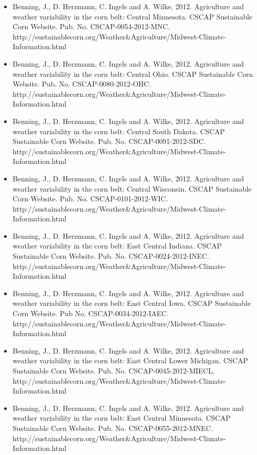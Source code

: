 \begin{itemize}
\item Benning, J., D. Herzmann, C. Ingels and A. Wilke, 2012. Agriculture and weather variability in the corn belt: Central Minnesota. CSCAP Sustainable Corn Website. Pub. No. CSCAP-0054-2012-MNC. http://sustainablecorn.org/Weather\&Agriculture/Midwest-Climate-Information.html

\item Benning, J., D. Herzmann, C. Ingels and A. Wilke, 2012. Agriculture and weather variability in the corn belt: Central Ohio. CSCAP Sustainable Corn Website. Pub. No. CSCAP-0080-2012-OHC. http://sustainablecorn.org/Weather\&Agriculture/Midwest-Climate-Information.html

\item Benning, J., D. Herzmann, C. Ingels and A. Wilke, 2012. Agriculture and weather variability in the corn belt: Central South Dakota. CSCAP Sustainable Corn Website. Pub. No. CSCAP-0091-2012-SDC. http://sustainablecorn.org/Weather\&Agriculture/Midwest-Climate-Information.html

\item Benning, J., D. Herzmann, C. Ingels and A. Wilke, 2012. Agriculture and weather variability in the corn belt: Central Wisconsin. CSCAP Sustainable Corn Website. Pub. No. CSCAP-0101-2012-WIC. http://sustainablecorn.org/Weather\&Agriculture/Midwest-Climate-Information.html

\item Benning, J., D. Herzmann, C. Ingels and A. Wilke, 2012. Agriculture and weather variability in the corn belt: East Central Indiana. CSCAP Sustainable Corn Website. Pub. No. CSCAP-0024-2012-INEC. http://sustainablecorn.org/Weather\&Agriculture/Midwest-Climate-Information.html

\item Benning, J., D. Herzmann, C. Ingels and A. Wilke, 2012. Agriculture and weather variability in the corn belt: East Central Iowa. CSCAP Sustainable Corn Website. Pub No. CSCAP-0034-2012-IAEC. http://sustainablecorn.org/Weather\&Agriculture/Midwest-Climate-Information.html

\item Benning, J., D. Herzmann, C. Ingels and A. Wilke, 2012. Agriculture and weather variability in the corn belt: East Central Lower Michigan. CSCAP Sustainable Corn Website. Pub. No. CSCAP-0045-2012-MIECL. http://sustainablecorn.org/Weather\&Agriculture/Midwest-Climate-Information.html

\item Benning, J., D. Herzmann, C. Ingels and A. Wilke, 2012. Agriculture and weather variability in the corn belt: East Central Minnesota. CSCAP Sustainable Corn Website. Pub. No. CSCAP-0055-2012-MNEC. http://sustainablecorn.org/Weather\&Agriculture/Midwest-Climate-Information.html


\end{itemize}
